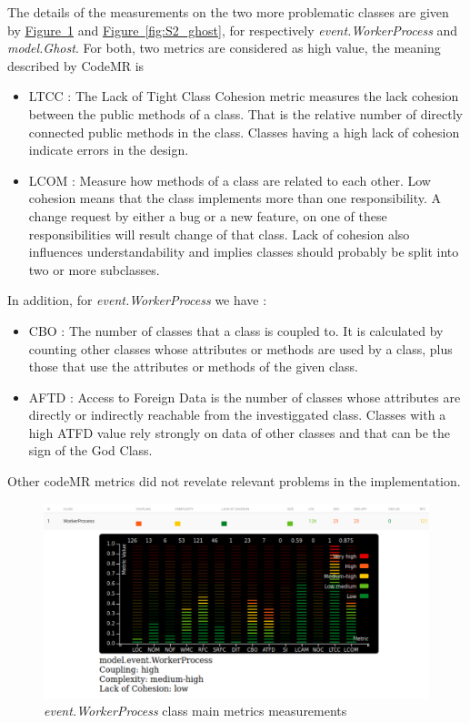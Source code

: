 \documentclass[]{article}
\newcommand{\wordlink}[2]{\hyperref[#2]{#1~\ref{#2}}}
\begin{document}
The details of the measurements on the two more problematic classes are given by \wordlink{Figure}{fig:S2_workerProcess} and \wordlink{Figure}{fig:S2_ghost}, for respectively \textit{event.WorkerProcess} and \textit{model.Ghost}. For both, two metrics are considered as high value, the meaning described by CodeMR is
\begin{itemize}
\item LTCC : The Lack of Tight Class Cohesion metric measures the lack cohesion between the public methods of a class. That is the relative number of directly connected public methods in the class. Classes having a high lack of cohesion indicate errors in the design.
\item LCOM : Measure how methods of a class are related to each other. Low cohesion means that the class implements more than one responsibility. A change request by either a bug or a new feature, on one of these responsibilities will result change of that class. Lack of cohesion also influences understandability and implies classes should probably be split into two or more subclasses.
\end{itemize}

In addition, for \textit{event.WorkerProcess} we have :
\begin{itemize}
\item CBO : The number of classes that a class is coupled to. It is calculated by counting other classes whose attributes or methods are used by a class, plus those that use the attributes or methods of the given class.
\item AFTD : Access to Foreign Data is the number of classes whose attributes are directly or indirectly reachable from the investiggated class. Classes with a high ATFD value rely strongly on data of other classes and that can be the sign of the God Class.
\end{itemize}

Other codeMR metrics did not revelate relevant problems in the implementation.

\newpage

\begin{figure}[h]
\centering
\includegraphics[width=0.9\linewidth]{S2-WorkerProcess_full}
\caption{\textit{event.WorkerProcess} class main metrics measurements}
\label{fig:S2_workerProcess}
\end{figure}
\end{document}
